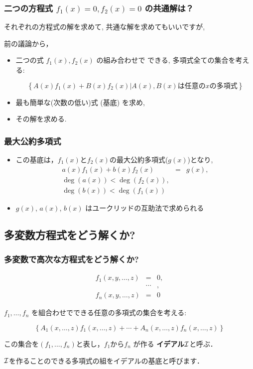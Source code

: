\documentclass[dvipdfmx,11pt,notheorems]{beamer}
\theoremstyle{definition}
\begin{document}
\begin{frame}\frametitle{
二つの方程式  $f_1(x)=0, f_2(x)=0$ の共通解は？}

  それぞれの方程式の解を求めて, 共通な解を求めてもいいですが,

  前の議論から，

\begin{itemize}
\item 二つの式 $f_1(x), f_2(x)$ の組み合わせで
  できる, 多項式全ての集合を考える:

    \[
\left\{A(x) f_1(x) + B(x) f_2(x) | A(x), B(x) \mbox{は任意の$x$の多項式}\right\}
\]


\item 最も簡単な(次数の低い)式 (基底) を求め,
\item その解を求める.
\end{itemize}  
\end{frame}

\begin{frame}\frametitle{最大公約多項式}
\begin{itemize}
\item この基底は，$f_1(x)$と$f_2(x)$の最大公約多項式($g(x)$)となり,
  \[
  \begin{array}{lcr}
    a(x) f_1(x) + b(x) f_2(x) & = & g(x),\\
    \deg(a(x)) < \deg(f_2(x)),\\
    \deg(b(x)) < \deg(f_1(x)) 
  \end{array}
  \]

\item $g(x)$, $a(x)$, $b(x)$ はユークリッドの互助法で求められる
  
\end{itemize}
\end{frame}

\subsection{多変数方程式をどう解くか?}

\begin{frame}\frametitle{多変数で高次な方程式をどう解くか?}
\[
  \begin{array}{rcl}
    f_1(x, y, \ldots, z) & = & 0, \\
    &\cdots&, \\
    f_n(x, y, \ldots, z) & = & 0
  \end{array}
\]

$f_1, \ldots, f_n$ を組合わせでできる任意の多項式の集合を考える:

\[ 
\left\{ A_1(x, \ldots, z) f_1(x, \ldots, z) + \cdots + A_n(x, \ldots, z)
 f_n(x, \ldots, z) \right\}
\]

この集合を$(f_1, ... , f_n)$と表し，$f_1$から$f_n$ が作る
{\bf イデアル}${\cal I}$と呼ぶ．

${\cal I}$を作ることのできる多項式の組をイデアルの基底と呼びます．

\end{frame}
\end{document}
